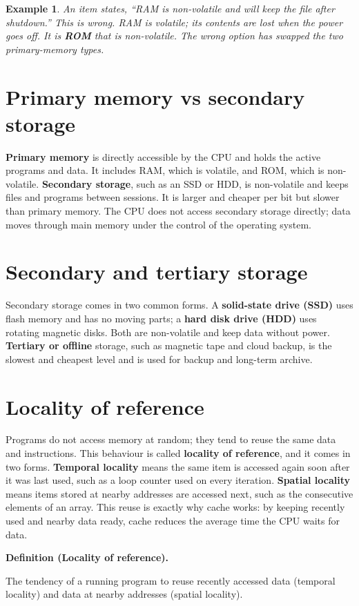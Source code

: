 \documentclass[11pt]{article}
\newtheorem{example}{Example}[section]
\newenvironment{definitionbox}[1]{%
  \par\noindent\textbf{Definition (#1).}\ \itshape
}{\par\vspace{0.3em}}
\begin{document}
\begin{example}
An item states, ``RAM is non-volatile and will keep the file after
shutdown.'' This is wrong. RAM is volatile; its contents are lost when the
power goes off. It is \textbf{ROM} that is non-volatile. The wrong option has
swapped the two primary-memory types.
\end{example}

\section{Primary memory vs secondary storage}
\textbf{Primary memory} is directly accessible by the CPU and holds the
active programs and data. It includes RAM, which is volatile, and ROM, which
is non-volatile. \textbf{Secondary storage}, such as an SSD or HDD, is
non-volatile and keeps files and programs between sessions. It is larger and
cheaper per bit but slower than primary memory. The CPU does not access
secondary storage directly; data moves through main memory under the control
of the operating system.

\section{Secondary and tertiary storage}
Secondary storage comes in two common forms. A \textbf{solid-state drive
(SSD)} uses flash memory and has no moving parts; a \textbf{hard disk drive
(HDD)} uses rotating magnetic disks. Both are non-volatile and keep data
without power. \textbf{Tertiary or offline} storage, such as magnetic tape
and cloud backup, is the slowest and cheapest level and is used for backup
and long-term archive.

\section{Locality of reference}
Programs do not access memory at random; they tend to reuse the same data
and instructions. This behaviour is called \textbf{locality of reference},
and it comes in two forms. \textbf{Temporal locality} means the same item is
accessed again soon after it was last used, such as a loop counter used on
every iteration. \textbf{Spatial locality} means items stored at nearby
addresses are accessed next, such as the consecutive elements of an array.
This reuse is exactly why cache works: by keeping recently used and nearby
data ready, cache reduces the average time the CPU waits for data.

\begin{definitionbox}{Locality of reference}
The tendency of a running program to reuse recently accessed data
(temporal locality) and data at nearby addresses (spatial locality).
\end{definitionbox}
\end{document}
